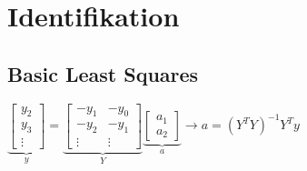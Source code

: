 \section{Identifikation}

\subsection{Basic Least Squares}

$\underbrace{\begin{bmatrix}
	y_2 \\ 
	y_3 \\ 
	\vdots 
\end{bmatrix}}_{y} = 
\underbrace{\begin{bmatrix}
	-y_1 & -y_0 \\ 
	-y_2 & -y_1 \\
	\vdots & \vdots
\end{bmatrix}}_{Y} 
\underbrace{\begin{bmatrix}
	a_1 \\ 
	a_2
\end{bmatrix}}_{a} \longrightarrow a = (Y^TY)^{-1}Y^Ty$